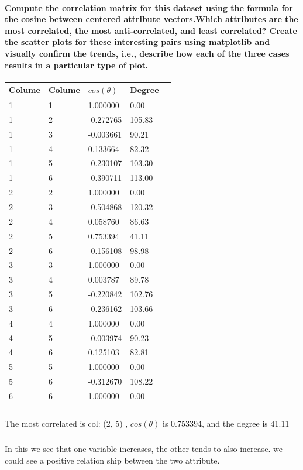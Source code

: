 \documentclass{article}
\begin{document}
\paragraph{Compute the correlation matrix for this dataset using the formula for the cosine between centered attribute vectors.Which attributes are the most correlated, the most anti-correlated, and least correlated? Create the scatter plots for these interesting pairs using matplotlib and visually confirm the trends, i.e., describe how each of the three cases results in a particular type of plot.}
\begin{center}
\begin{tabular}{| l | l | l | l | l |}
\hline
Colume & Colume  & $cos(\theta)$  & Degree\\ \hline
1& 1&1.000000&0.00\\ \hline
1&2&-0.272765&105.83\\ \hline
1& 3&-0.003661&90.21\\ \hline
1& 4&0.133664&82.32\\ \hline
1& 5&-0.230107&103.30\\ \hline
1& 6&-0.390711&113.00\\ \hline
2& 2&1.000000&0.00\\ \hline
2& 3&-0.504868&120.32\\ \hline
2& 4&0.058760&86.63\\ \hline
2& 5&0.753394&41.11\\ \hline
2& 6&-0.156108&98.98\\ \hline
3& 3&1.000000&0.00\\ \hline
3& 4&0.003787&89.78\\ \hline
3& 5&-0.220842&102.76\\ \hline
3& 6&-0.236162&103.66\\ \hline
4& 4&1.000000&0.00\\ \hline
4&5&-0.003974&90.23\\ \hline
4& 6&0.125103&82.81\\ \hline
5& 5&1.000000&0.00\\ \hline
5&6&-0.312670&108.22\\ \hline
6& 6&1.000000&0.00\\ \hline
\end{tabular}
\end{center}
\subparagraph{}The most correlated is col: (2, 5) , $cos(\theta)$ is 0.753394, and the degree is 41.11
\subparagraph{}In this we see that one variable increases, the other tends to also increase. we could see a positive relation ship between the two attribute.
\end{document}
